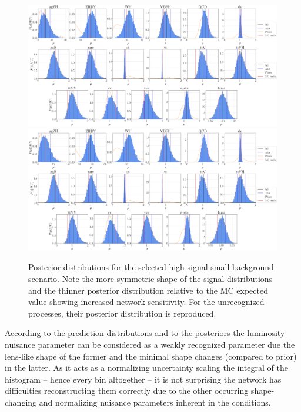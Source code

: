 \begin{figure}[h!]
	\centering
	\includegraphics[width=\linewidth]{figures/inference/194finalNoSummarye11000_posteriors}
	\includegraphics[width=\linewidth]{figures/inference/194finalSummary1Layer11000e300NodesCdim100_posteriors}
	\caption{Posterior distributions for the selected high-signal small-background scenario. Note the more symmetric shape of the signal distributions and the thinner posterior distribution relative to the MC expected value showing increased network sensitivity. For the unrecognized processes, their posterior distribution is reproduced.}
	\label{fig:HS-SM}
\end{figure}

According to the prediction distributions and to the posteriors the luminosity nuisance parameter can be considered as a weakly recognized parameter due the lens-like shape of the former and the minimal shape changes (compared to prior) in the latter. As it acts as a normalizing uncertainty scaling the integral of the histogram -- hence every bin altogether -- it is not surprising the network has difficulties reconstructing them correctly due to the other occurring shape-changing and normalizing nuisance parameters inherent in the conditions.

